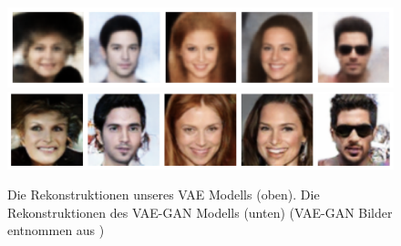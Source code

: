 \begin{figure}[hbt]
\centering
  \includegraphics[width=.7\textwidth]{gfx/outlook/ours}
  \includegraphics[width=.7\textwidth]{gfx/outlook/vae_gan_reconstruction}
  \caption{Die Rekonstruktionen unseres VAE Modells (oben). Die Rekonstruktionen des VAE-GAN Modells (unten) (VAE-GAN Bilder entnommen aus \cite{Larsen2016})}
  \label{fig:vae_gan_reconstruction}
\end{figure}
